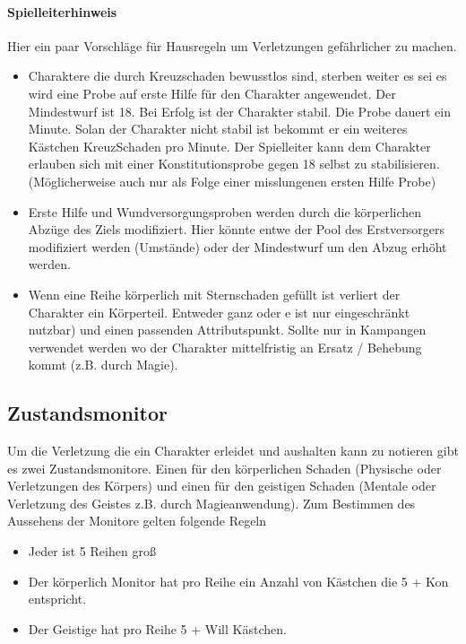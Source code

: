 \documentclass{article}
\begin{document}
\begin{mdframed}[hidealllines=true, backgroundcolor=black!10]
\paragraph{Spielleiterhinweis}

Hier ein paar Vorschläge für Hausregeln um Verletzungen gefährlicher zu machen.

\begin{itemize}
\item Charaktere die durch Kreuzschaden bewusstlos sind, sterben weiter es sei es wird eine Probe auf erste Hilfe für den Charakter angewendet. Der Mindestwurf ist 18. Bei Erfolg ist der Charakter stabil. Die Probe dauert ein Minute. Solan der Charakter nicht stabil ist bekommt er ein weiteres Kästchen KreuzSchaden pro Minute. Der Spielleiter kann dem Charakter erlauben sich mit einer Konstitutionsprobe gegen 18 selbst zu stabilisieren. (Möglicherweise auch nur als Folge einer misslungenen ersten Hilfe Probe)
\item Erste Hilfe und Wundversorgungsproben werden durch die körperlichen Abzüge des Ziels modifiziert. Hier könnte entwe der Pool des Erstversorgers modifiziert werden (Umstände) oder der Mindestwurf um den Abzug erhöht werden.
\item Wenn eine Reihe körperlich mit Sternschaden gefüllt ist verliert der Charakter ein Körperteil. Entweder ganz oder e ist nur eingeschränkt nutzbar) und einen passenden Attributspunkt. Sollte nur in Kampangen verwendet werden wo der Charakter mittelfristig an Ersatz / Behebung kommt (z.B. durch Magie).
\end{itemize}

\end{mdframed}
\begin{center}
\subsection{Zustandsmonitor}
\end{center}

Um die Verletzung die ein Charakter erleidet und aushalten kann zu notieren gibt es zwei Zustandsmonitore. Einen für
den körperlichen Schaden (Physische oder Verletzungen des Körpers) und einen für den geistigen Schaden (Mentale oder
Verletzung des Geistes z.B. durch Magieanwendung). Zum Bestimmen des Aussehens der Monitore gelten folgende Regeln

\begin{itemize}
\item Jeder ist 5 Reihen groß
\item Der körperlich Monitor hat pro Reihe ein Anzahl von Kästchen die 5 + Kon entspricht.
\item Der Geistige hat pro Reihe 5 + Will Kästchen.
\end{itemize}
\end{document}
